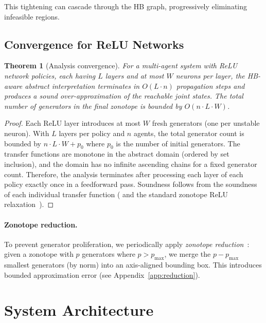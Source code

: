 \documentclass[11pt]{article}
\newtheorem{theorem}{Theorem}[section]
\begin{document}
This tightening can cascade through the HB graph, progressively eliminating
infeasible regions.

\subsection{Convergence for ReLU Networks}

\begin{theorem}[Analysis convergence]
\label{thm:convergence}
For a multi-agent system with ReLU network policies, each having $L$ layers
and at most $W$ neurons per layer, the HB-aware abstract interpretation
terminates in $O(L \cdot n)$ propagation steps and produces a sound
over-approximation of the reachable joint states. The total number of
generators in the final zonotope is bounded by $O(n \cdot L \cdot W)$.
\end{theorem}

\begin{proof}
Each ReLU layer introduces at most $W$ fresh generators (one per unstable
neuron). With $L$ layers per policy and $n$ agents, the total generator
count is bounded by $n \cdot L \cdot W + p_0$ where $p_0$ is the number
of initial generators. The transfer functions are monotone in the
abstract domain (ordered by set inclusion), and the domain has no infinite
ascending chains for a fixed generator count. Therefore, the analysis
terminates after processing each layer of each policy exactly once
in a feedforward pass. Soundness follows from the soundness of each
individual transfer function ( and the standard
zonotope ReLU relaxation~\cite{singh2019abstract}).
\end{proof}

\paragraph{Zonotope reduction.}
To prevent generator proliferation, we periodically apply \emph{zonotope
reduction}~\cite{kopetzki2017methods}: given a zonotope with $p$ generators
where $p > p_{\max}$, we merge the $p - p_{\max}$ smallest generators
(by norm) into an axis-aligned bounding box. This introduces bounded
approximation error (see Appendix~\ref{app:reduction}).

\section{System Architecture}
\label{sec:system}
\end{document}
